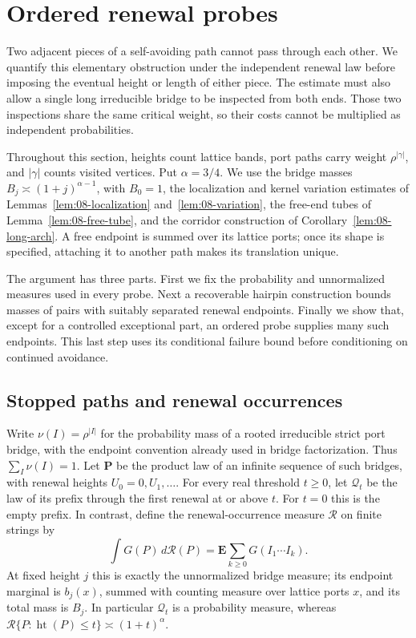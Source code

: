 \section{Ordered renewal probes}
\label{sec:10-thermal-probes}

Two adjacent pieces of a self-avoiding path cannot pass through each
other. We quantify this elementary obstruction under the independent
renewal law before imposing the eventual height or length of either
piece. The estimate must also allow a single long irreducible bridge to
be inspected from both ends. Those two inspections share the same
critical weight, so their costs cannot be multiplied as independent
probabilities.

Throughout this section, heights count lattice bands, port paths carry
weight $\rho^{|\gamma|}$, and $|\gamma|$ counts visited vertices. Put
$\alpha=3/4$. We use the bridge masses
$B_j\asymp(1+j)^{\alpha-1}$, with $B_0=1$, the localization and kernel
variation estimates of Lemmas~\ref{lem:08-localization}
and~\ref{lem:08-variation}, the free-end tubes of
Lemma~\ref{lem:08-free-tube}, and the corridor construction of
Corollary~\ref{lem:08-long-arch}. A free endpoint is summed over its lattice
ports; once its shape is specified, attaching it to another path makes
its translation unique.

The argument has three parts. First we fix the probability and
unnormalized measures used in every probe. Next a recoverable hairpin
construction bounds masses of pairs with suitably separated renewal
endpoints. Finally we show that, except for a controlled exceptional
part, an ordered probe supplies many such endpoints. This last step
uses its conditional failure bound before conditioning on continued
avoidance.

\subsection{Stopped paths and renewal occurrences}

Write \(\nu(I)=\rho^{|I|}\) for the probability mass of a rooted
irreducible strict port bridge, with the endpoint convention already used
in bridge factorization. Thus \(\sum_I\nu(I)=1\). Let \(\mathbf P\) be
the product law of an infinite sequence of such bridges, with renewal
heights \(U_0=0,U_1,\ldots\). For every real threshold $t\ge0$, let \(\mathcal Q_t\) be the law of its
prefix through the first renewal at or above \(t\). For \(t=0\) this is
the empty prefix. In contrast, define the renewal-occurrence measure
\(\mathcal R\) on finite strings by
\[
 \int G(P)\,d\mathcal R(P)
   =\mathbf E\sum_{k\ge0}G(I_1\cdots I_k).
\]
At fixed height \(j\) this is exactly the unnormalized bridge measure;
its endpoint marginal is \(b_j(x)\), summed with counting measure over
lattice ports \(x\), and its total mass is \(B_j\).
In particular \(\mathcal Q_t\) is a probability measure, whereas
\(\mathcal R\{P:\operatorname{ht}(P)\le t\}\asymp(1+t)^\alpha\).

